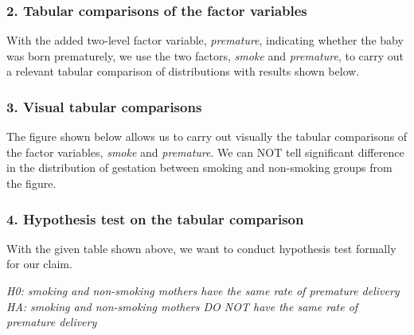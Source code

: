 \documentclass{article}
\begin{document}
\subsubsection*{2. Tabular comparisons of the factor variables}
\hspace{12 pt} With the added two-level factor variable,
\textit{premature}, indicating whether the baby was born prematurely,
we use the two factors, \textit{smoke} and \textit{premature}, to
carry out a relevant tabular comparison of distributions with results
shown below. 


\subsubsection*{3. Visual tabular comparisons}
\hspace{12 pt} The figure shown below allows us to carry out visually the
tabular comparisons of the factor variables, \textit{smoke} and \textit{premature}.
We can NOT tell significant difference in the distribution of
gestation between smoking and non-smoking groups from the figure.

\subsubsection*{4. Hypothesis test on the tabular comparison}
\hspace{12 pt} With the given table shown above, we want to conduct
hypothesis test formally for our claim. \newline


\hspace{12 pt}\textit{H0: smoking and non-smoking mothers have the
  same rate of premature delivery} \newline
\vspace{2 pt} 
\hspace{24 pt}\textit{HA: smoking and non-smoking mothers DO NOT have the
  same rate of premature delivery} \newline
\end{document}
